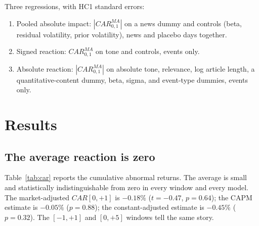 \documentclass[10pt,twocolumn,a4paper]{article}
\begin{document}
Three regressions, with HC1 standard errors:

\begin{enumerate}
\item Pooled absolute impact: $|CAR^{MA}_{0,1}|$ on a news dummy and controls (beta, residual
volatility, prior volatility), news and placebo days together.
\item Signed reaction: $CAR^{MA}_{0,1}$ on tone and controls, events only.
\item Absolute reaction: $|CAR^{MA}_{0,1}|$ on absolute tone, relevance, log article length, a
quantitative-content dummy, beta, sigma, and event-type dummies, events only.
\end{enumerate}

\section{Results}

\subsection{The average reaction is zero}

Table~\ref{tab:car} reports the cumulative abnormal returns. The average is small and statistically
indistinguishable from zero in every window and every model. The market-adjusted $CAR[0,+1]$ is
$-0.18\%$ ($t=-0.47$, $p=0.64$); the CAPM estimate is $-0.05\%$ ($p=0.88$); the constant-adjusted
estimate is $-0.45\%$ ($p=0.32$). The $[-1,+1]$ and $[0,+5]$ windows tell the same story.
\end{document}
